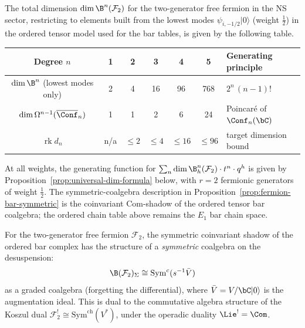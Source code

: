 \begin{computation}
\label{comp:fermion-dim-table}
The total dimension $\dim \B^n(\mathcal{F}_2)$ for the two-generator
free fermion in the NS sector, restricting to elements built
from the lowest modes $\psi_{i,-1/2}|0\rangle$ (weight $\tfrac{1}{2}$)
in the ordered tensor model used for the bar tables,
is given by the following table.

\begin{center}
\renewcommand{\arraystretch}{1.2}
\begin{tabular}{c|ccccc|l}
Degree $n$ & 1 & 2 & 3 & 4 & 5 & Generating principle \\
\hline
$\dim \B^n$ (lowest modes only) & 2 & 4 & 16 & 96 & 768
 & $2^n\,(n{-}1)!$ \\
$\dim \Omega^{n-1}(\overline{\Conf}_n)$ & 1 & 1 & 2 & 6 & 24
 & Poincar\'{e} of $\Conf_n(\bC)$ \\
$\operatorname{rk} d_n$ & n/a & $\leq 2$ & $\leq 4$ & $\leq 16$ & $\leq 96$
& target dimension bound
\end{tabular}
\end{center}

At all weights, the generating function for
$\sum_n \dim \B^n_h(\mathcal{F}_2) \cdot t^n \cdot q^h$ is given
by Proposition~\ref{prop:universal-dim-formula} below, with
$r = 2$ fermionic generators of weight $\frac{1}{2}$.
The symmetric-coalgebra description in
Proposition~\ref{prop:fermion-bar-symmetric} is the coinvariant
Com-shadow of the ordered tensor bar coalgebra; the ordered chain table
above remains the $E_1$ bar chain space.
\end{computation}

\begin{proposition}
\label{prop:fermion-bar-symmetric}
For the two-generator free fermion $\mathcal{F}_2$, the symmetric
coinvariant shadow of the ordered bar complex has the structure of a
\emph{symmetric} coalgebra on the desuspension:
\begin{equation}\label{eq:fermion-bar-symcoalg}
\B(\mathcal{F}_2)_{\Sigma} \cong \mathrm{Sym}^c(s^{-1}\bar{V})
\end{equation}
as a graded coalgebra (forgetting the differential), where
$\bar{V} = V/\bC|0\rangle$ is the augmentation ideal.
This is dual to the commutative algebra structure of the
Koszul dual $\mathcal{F}_2^! \cong
\mathrm{Sym}^{\mathrm{ch}}(V^*)$, under the operadic duality
$\Lie^! = \Com$.
\end{proposition}

